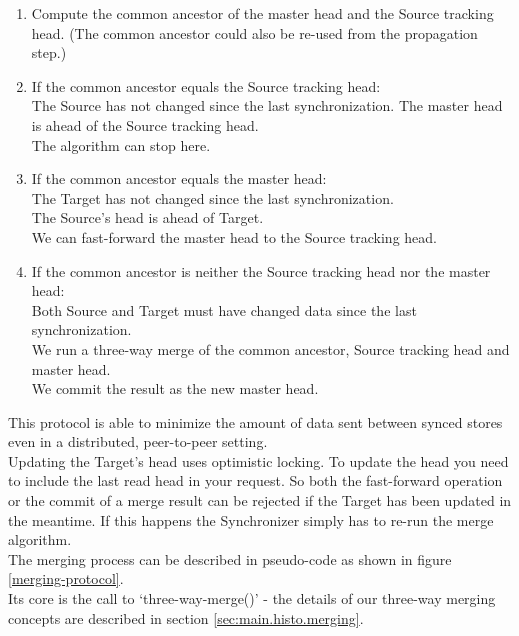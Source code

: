 \begin{enumerate}
\item Compute the common ancestor of the master head and the Source tracking head. (The common ancestor could also be re-used from the propagation step.)
\item If the common ancestor equals the Source tracking head:\\
  The Source has not changed since the last synchronization. The master head is ahead of the Source tracking head.\\
  The algorithm can stop here.
\item If the common ancestor equals the master head:\\
  The Target has not changed since the last synchronization.\\
  The Source's head is ahead of Target.\\
  We can fast-forward the master head to the Source tracking head.
\item If the common ancestor is neither the Source tracking head nor the master head:\\
  Both Source and Target must have changed data since the last synchronization.\\
  We run a three-way merge of the common ancestor, Source tracking head and master head.\\
  We commit the result as the new master head.
\end{enumerate}

This protocol is able to minimize the amount of data sent between synced
stores even in a distributed, peer-to-peer setting.\\

Updating the Target's head uses optimistic locking.
To update the head you need to include the last read head in your request.
So both the fast-forward operation or the commit of a merge result can be rejected if the Target has been updated in the meantime.
If this happens the Synchronizer simply has to re-run the merge algorithm.\\

The merging process can be described in pseudo-code as shown in figure \ref{merging-protocol}.\\
Its core is the call to `three-way-merge()' - the details of our three-way merging concepts are described in section \ref{sec:main.histo.merging}.\\

